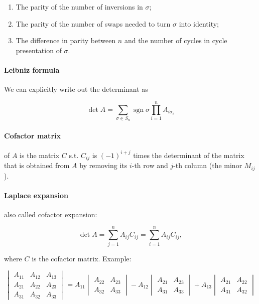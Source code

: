 \documentclass{article}
\begin{document}
\begin{enumerate}
    \item The parity of the number of inversions in $\sigma$;
    \item The parity of the number of swaps needed to turn $\sigma$ into identity;
    \item The difference in parity between $n$ and the number of cycles in cycle presentation of $\sigma$.
\end{enumerate}

\paragraph{Leibniz formula} We can explicitly write out the determinant as

$$
\det A = \sum\limits_{\sigma \in S_n} \operatorname{sgn} \sigma \prod\limits_{i=1}^n A_{i \sigma_i}
$$

\paragraph{Cofactor matrix} of $A$ is the matrix $C$ s.t. $C_{ij}$ is $(-1)^{i+j}$ times the determinant of the matrix that is obtained from $A$ by removing its $i$-th row and $j$-th column (the minor $M_{ij}$).

\paragraph{Laplace expansion} also called cofactor expansion:

$$
\det A = \sum\limits_{j=1}^n A_{ij} C_{ij} = \sum\limits_{i=1}^n A_{ij} C_{ij},
$$

where $C$ is the cofactor matrix. Example:

$$
\begin{vmatrix}
    A_{11} & A_{12} & A_{13} \\
    A_{21} & A_{22} & A_{23} \\
    A_{31} & A_{32} & A_{33}
\end{vmatrix} = A_{11} \begin{vmatrix}
    A_{22} & A_{23} \\ A_{32} & A_{33}
\end{vmatrix} - A_{12} \begin{vmatrix}
    A_{21} & A_{23} \\ A_{31} & A_{33}
\end{vmatrix} + A_{13} \begin{vmatrix}
    A_{21} & A_{22} \\
    A_{31} & A_{32}
\end{vmatrix}
$$
\end{document}
